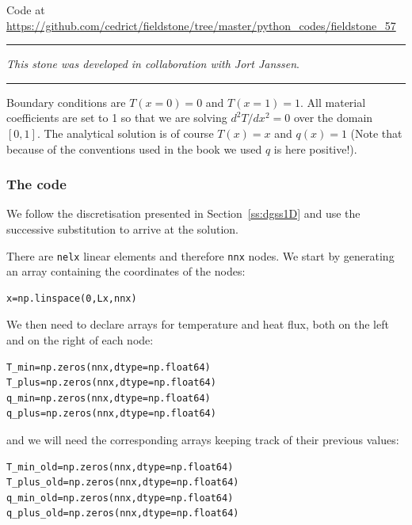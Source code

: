 

\begin{center}
Code at \url{https://github.com/cedrict/fieldstone/tree/master/python_codes/fieldstone_57}
\end{center}

\par\noindent\rule{\textwidth}{0.4pt}

{\sl This stone was developed in collaboration with Jort Janssen}. 

\par\noindent\rule{\textwidth}{0.4pt}


Boundary conditions are $T(x=0)=0$ and $T(x=1)=1$. All material coefficients are set to 1
so that we are solving $d^2T/dx^2=0$ over the domain $[0,1]$. The analytical solution is 
of course $T(x)=x$ and $q(x)=1$ (Note that because of the conventions used in the book 
we used $q$ is here positive!). 

\subsubsection*{The code}

We follow the discretisation presented in Section~\ref{ss:dgss1D} and use the 
successive substitution to arrive at the solution. 

There are {\tt nelx} linear elements and therefore {\tt nnx} nodes.
We start by generating an array containing the coordinates of the nodes:
\begin{lstlisting}
x=np.linspace(0,Lx,nnx)
\end{lstlisting}
We then need to declare arrays for temperature and heat flux, both on the left and on the right of 
each node:
\begin{lstlisting}
T_min=np.zeros(nnx,dtype=np.float64)       
T_plus=np.zeros(nnx,dtype=np.float64)      
q_min=np.zeros(nnx,dtype=np.float64)       
q_plus=np.zeros(nnx,dtype=np.float64)
\end{lstlisting}
and we will need the corresponding arrays keeping track of their previous values:
\begin{lstlisting}
T_min_old=np.zeros(nnx,dtype=np.float64)    
T_plus_old=np.zeros(nnx,dtype=np.float64)   
q_min_old=np.zeros(nnx,dtype=np.float64)    
q_plus_old=np.zeros(nnx,dtype=np.float64)
\end{lstlisting}

